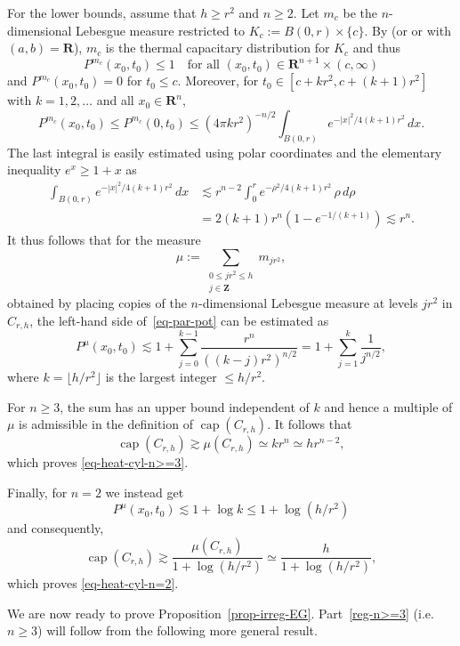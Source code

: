 \documentclass[a4paper, twoside]{article}
\makeatletter
\theoremstyle{propositional}
\theoremstyle{descriptive}
\renewenvironment{proof}[1][\proofname]{\par
  \pushQED{\qed}%
  \normalfont
  \trivlist
  \item[\hskip\labelsep
        \itshape
    #1\@addpunct{.}]\ignorespaces
}{%
  \popQED\endtrivlist\@endpefalse
}
\numberwithin{equation}{section}
\newcommand{\R}{\mathbf{R}}
\newcommand{\Z}{\mathbf{Z}}
\newcommand{\simge}{\gtrsim}
\newcommand{\simle}{\lesssim}
\DeclareMathOperator{\capp}{cap}
\makeatother
\begin{document}
\begin{proof}
For the lower bounds, 
assume that $h\ge r^2$ and
$n\ge2$.
Let $m_c$ be the $n$-dimensional Lebesgue measure restricted to $K_c:=B(0,r)\times \{c\}$.
By \cite[Proposizione~5.1]{Lanc73} (or \cite[Theorem~9]{watson78} or
\cite[Theorem~7.55]{watson} with $(a,b)=\R$), 
$m_c$ is the thermal capacitary distribution for $K_c$ and thus
\[
P^{m_c}(x_0,t_0) \le 1 \quad \text{for all } (x_0,t_0)\in \R^{n+1}\times (c,\infty)
\]
and $P^{m_c} (x_0,t_0)= 0$ for $t_0\le c$.
Moreover, for $t_0\in [c+kr^2,c+(k+1)r^2]$ with $k=1,2,\dots$ and all $x_0\in \R^n$,
\begin{equation*} %
P^{m_c}(x_0,t_0) \le P^{m_c}(0,t_0) 
           \le (4\pi kr^2)^{-n/2} \int_{B(0,r)} e^{-|x|^2/4(k+1)r^2}\, dx.
\end{equation*} %
The last integral is easily estimated using polar coordinates
and the elementary inequality $e^x \ge 1+x$  as
\begin{align*}
\int_{B(0,r)} e^{-|x|^2/4(k+1)r^2}\, dx
&\simle r^{n-2} \int_0^r e^{-\rho^2/4(k+1)r^2} \, \rho \,d\rho \\
&= 2(k+1) r^{n} (1-e^{-1/(k+1)}) \simle r^n.
\end{align*}
It thus follows that for the measure 
\[
\mu := \sum_{\substack{0\le jr^2\le h \\ j \in \Z}} m_{jr^2},
\]
obtained by placing copies 
of the $n$-dimensional Lebesgue measure 
at levels $jr^2$ in $C_{r,h}$,
the left-hand side  of~\eqref{eq-par-pot} can be estimated as
\begin{equation*} %
P^\mu(x_0,t_0)
\simle 1 + \sum_{j=0}^{k-1} 
\frac{r^n}{((k-j)r^2)^{n/2}}  
=  1 + \sum_{j=1}^k \frac{1}{j^{n/2}},
\end{equation*} %
where $k=\lfloor h/r^2 \rfloor$ is the largest integer $\le h/r^2$.

For $n\ge3$, the sum has an upper bound 
independent of $k$ and hence a multiple of $\mu$ is admissible 
in the definition of $\capp(C_{r,h})$.
It follows that 
\[
\capp(C_{r,h}) \simge \mu(C_{r,h}) \simeq kr^n \simeq h r^{n-2},
\]
which proves \eqref{eq-heat-cyl-n>=3}. 

Finally, for $n=2$ we instead get 
\[
P^\mu(x_0,t_0) 
\simle  1 + \log k \le 1+ \log(h/r^2)
\]
and consequently,
\[
\capp(C_{r,h}) \simge \frac{\mu(C_{r,h})}{1 + \log(h/r^2)} 
\simeq \frac{h}{1+\log(h/r^2)},
\]
which proves \eqref{eq-heat-cyl-n=2}.
\end{proof}



We are now ready to prove Proposition~\ref{prop-irreg-EG}.
Part~\ref{reg-n>=3} (i.e.\ $n \ge3$) will follow from the 
following more general result.
\end{document}
